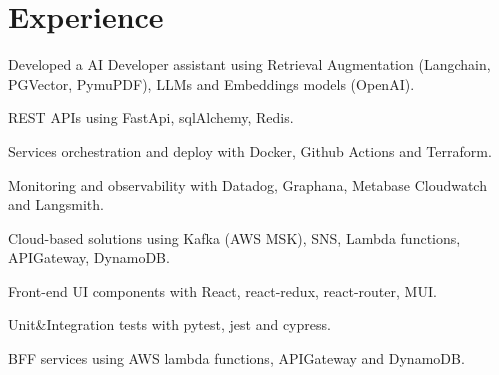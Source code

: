 \documentclass[]{deedy-resume-reversed}
\begin{document}
%
%

%
%

%
%

\begin{minipage}[t]{0.6\textwidth}


\section{Experience}
\vspace{\topsep} %
\begin{tightemize}
\item Developed a AI Developer assistant using Retrieval Augmentation (Langchain, PGVector, PymuPDF), LLMs and Embeddings models (OpenAI).
\item REST APIs using FastApi, sqlAlchemy, Redis.
\item Services orchestration and deploy with Docker, Github Actions and Terraform.
\item Monitoring and observability with Datadog, Graphana, Metabase Cloudwatch and Langsmith.
\item Cloud-based solutions using Kafka (AWS MSK), SNS, Lambda functions, APIGateway, DynamoDB.
\item Front-end UI components with React, react-redux, react-router, MUI.
\item Unit\&Integration tests with pytest, jest and cypress.
\item BFF services using AWS lambda functions, APIGateway and DynamoDB.
\end{tightemize}
\sectionsep


\end{minipage}
\end{document}
